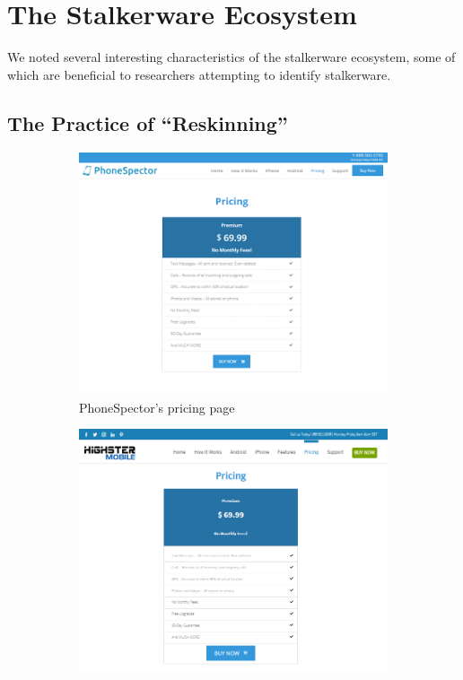 \documentclass[acmtog]{acmart}
\begin{document}
\section{The Stalkerware Ecosystem}

We noted several interesting characteristics of the stalkerware ecosystem, some 
of which are beneficial to researchers attempting to identify stalkerware.

\subsection{The Practice of ``Reskinning''}
\label{reskinning}

\begin{figure}
	\centering
	\begin{subfigure}{0.8\columnwidth}
		\centering
		\includegraphics[width=0.9\linewidth]{../images/phonespector_small.png}
		\caption{PhoneSpector's pricing page }
		\label{fig:phonespector}
	\end{subfigure}%
	\begin{subfigure}{0.8\columnwidth}
		\centering
		\includegraphics[width=0.9\linewidth]{../images/highstermobile_small.png}

\end{subfigure}
\end{figure}
\end{document}
